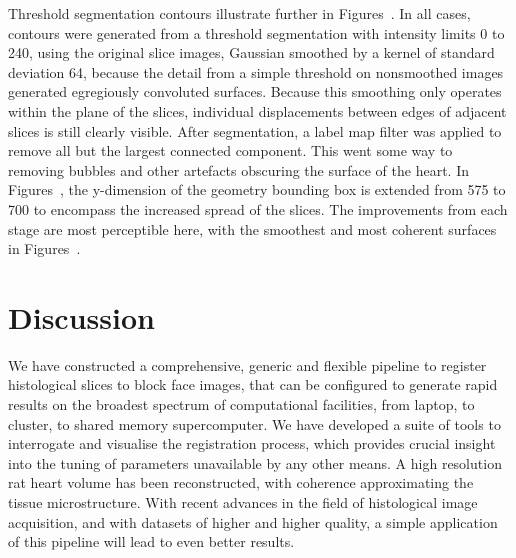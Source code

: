 	Threshold segmentation contours illustrate further in Figures~. In all cases, contours were generated from a threshold segmentation with intensity limits 0 to 240, using the original slice images, Gaussian smoothed by a kernel of standard deviation 64, because the detail from a simple threshold on nonsmoothed images generated egregiously convoluted surfaces. Because this smoothing only operates within the plane of the slices, individual displacements between edges of adjacent slices is still clearly visible. After segmentation, a label map filter was applied to remove all but the largest connected component. This went some way to removing bubbles and other artefacts obscuring the surface of the heart. In Figures~, the y-dimension of the geometry bounding box is extended from 575 to 700 to encompass the increased spread of the slices. The improvements from each stage are most perceptible here, with the smoothest and most coherent surfaces in Figures~.
	

\section{Discussion} %
\label{sec:discussion}
  We have constructed a comprehensive, generic and flexible pipeline to register histological slices to block face images, that can be configured to generate rapid results on the broadest spectrum of computational facilities, from laptop, to cluster, to shared memory supercomputer. We have developed a suite of tools to interrogate and visualise the registration process, which provides crucial insight into the tuning of parameters unavailable by any other means. A high resolution rat heart volume has been reconstructed, with coherence approximating the tissue microstructure. With recent advances in the field of histological image acquisition, and with datasets of higher and higher quality, a simple application of this pipeline will lead to even better results.
	

